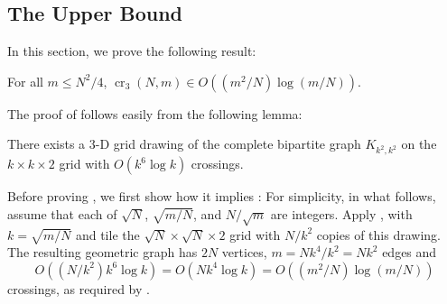 \documentclass[12pt]{article}
\newcommand{\n}{N}
\DeclareMathOperator{\crs}{cr}
\begin{document}

\subsection{The Upper Bound}

In this section, we prove the following result:

\begin{thm}
  For all $m\le\n^2/4$, $\crs_3(\n,m) \in O((m^2/\n)\log (m/\n))$.
\end{thm}

The proof of  follows easily from the following
lemma:
\begin{lem}
  There exists a 3-D grid drawing of the complete bipartite graph
  $K_{k^2,k^2}$ on the $k\times k\times 2$ grid with $O(k^6\log k)$
  crossings.
\end{lem}

Before proving , we first show how it implies
: For simplicity, in what follows, assume
that each of $\sqrt{\n}$, $\sqrt{m/\n}$, and $\n/\sqrt{m}$ are integers.
Apply , with $k=\sqrt{m/\n}$ and tile the
$\sqrt{\n}\times\sqrt{\n}\times 2$ grid with $\n/k^2$ copies of
this drawing. The resulting geometric graph has $2\n$ vertices,
$m=\n k^4/k^2=\n k^2$ edges and
\[ 
   O((\n/k^2)k^6\log k) = O(\n k^4\log k) = O((m^2/\n)\log(m/\n))
\] 
crossings, as required by .
\end{document}
